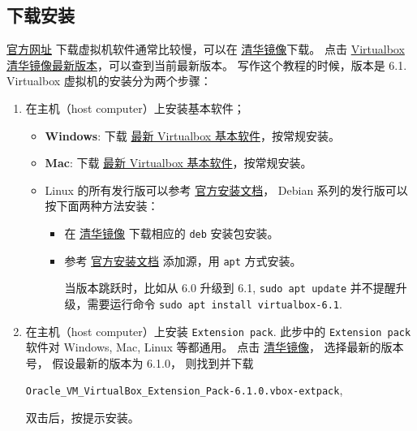 \documentclass[
    11pt,
    base=hide,
    cite=authoryear,
    device=phone,
    lang=cn,
    mode=simple,
    result=answer,
    toc=onecol,
]{elegantbook_sierxue}
\begin{document}
\subsection{下载安装}%
\label{sub:vbox-install}
\href{https://www.virtualbox.org/wiki/Downloads}{官方网址}
下载虚拟机软件通常比较慢，可以在
\href{https://mirror.tuna.tsinghua.edu.cn/virtualbox/}{清华镜像}下载。
点击
\href{https://mirror.tuna.tsinghua.edu.cn/virtualbox/LATEST.TXT}
{Virtualbox清华镜像最新版本}，可以查到当前最新版本。
写作这个教程的时候，版本是 6.1.
Virtualbox 虚拟机的安装分为两个步骤：
\begin{enumerate}
    \item 在主机（host computer）上安装基本软件；
        \begin{itemize}
            \item \textbf{Windows}: 下载
                \href{https://mirror.tuna.tsinghua.edu.cn/virtualbox/virtualbox-Win-latest.exe}
                {最新 Virtualbox 基本软件}，按常规安装。
            \item \textbf{Mac}: 下载
                \href{https://mirror.tuna.tsinghua.edu.cn/virtualbox/virtualbox-osx-latest.dmg}
                {最新 Virtualbox 基本软件}，按常规安装。
            \item Linux 的所有发行版可以参考
                \href{https://www.virtualbox.org/wiki/Linux_Downloads}{官方安装文档}，
                Debian 系列的发行版可以按下面两种方法安装：
                \begin{itemize}
                    \item 在
                        \href{https://mirror.tuna.tsinghua.edu.cn/virtualbox/}
                        {清华镜像}
                        下载相应的 \lstinline{deb} 安装包安装。
                    \item 参考
                        \href{https://www.virtualbox.org/wiki/Linux_Downloads}
                        {官方安装文档}
                        添加源，用 \lstinline{apt} 方式安装。
                        \begin{note}\label{note:vbox-apt-upgrade}
                           当版本跳跃时，比如从 6.0 升级到 6.1,
                           \lstinline{sudo apt update}
                           并不提醒升级，需要运行命令
                           \lstinline{sudo apt install virtualbox-6.1}.
                        \end{note}
                \end{itemize}
        \end{itemize}
    \item 在主机（host computer）上安装 \lstinline{Extension pack}.
        此步中的 \lstinline{Extension pack} 软件对 Windows, Mac, Linux
        等都通用。
        点击
        \href{https://mirror.tuna.tsinghua.edu.cn/virtualbox/}{清华镜像}，
        选择最新的版本号，
        假设最新的版本为 6.1.0，
        则找到并下载
        \begin{center}\label{center:vm-extension}
            \lstinline{Oracle_VM_VirtualBox_Extension_Pack-6.1.0.vbox-extpack},
        \end{center}
        双击后，按提示安装。
\end{enumerate}
\end{document}
